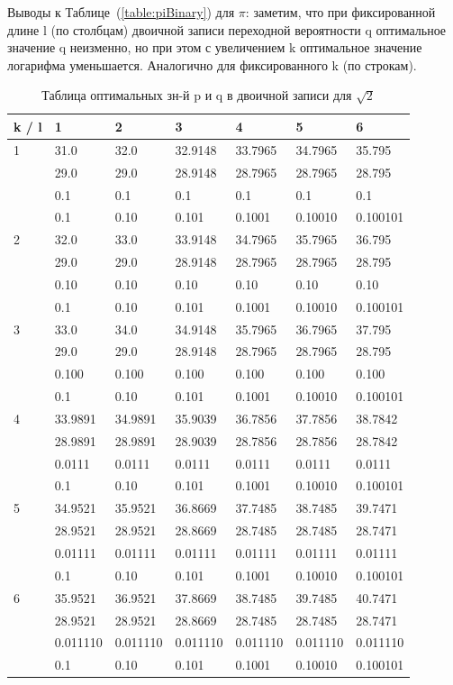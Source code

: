 \documentclass[12pt]{article}
\begin{document}
	
	Выводы к Таблице~(\ref{table:piBinary}) для $\pi$: заметим, что при фиксированной длине l (по столбцам) двоичной записи переходной вероятности q оптимальное значение q неизменно, но при этом с увеличением k оптимальное значение логарифма уменьшается. Аналогично для фиксированного k (по строкам).
	
	\begin{table}[h]
		\caption{Таблица оптимальных зн-й p и q в двоичной записи для $\sqrt{2}$}
		\label{table:2Binary}
		\begin{center}
			\begin{tabular}{|l|l|l|l|l|l|l|}
				\hline
				k / l &1 & 2 & 3 & 4 & 5 & 6\\
				\hline
				1 & 31.0& 32.0& 32.9148& 33.7965& 34.7965& 35.795\\
				& 29.0& 29.0& 28.9148& 28.7965& 28.7965& 28.795\\
				& 0.1& 0.1& 0.1& 0.1& 0.1& 0.1\\
				& 0.1& 0.10& 0.101& 0.1001& 0.10010& 0.100101\\
				\hline
				2 & 32.0& 33.0& 33.9148& 34.7965& 35.7965& 36.795\\
				& 29.0& 29.0& 28.9148& 28.7965& 28.7965& 28.795\\
				& 0.10& 0.10& 0.10& 0.10& 0.10& 0.10\\
				& 0.1& 0.10& 0.101& 0.1001& 0.10010& 0.100101\\
				\hline
				3 & 33.0& 34.0& 34.9148& 35.7965& 36.7965& 37.795\\
				& 29.0& 29.0& 28.9148& 28.7965& 28.7965& 28.795\\
				& 0.100& 0.100& 0.100& 0.100& 0.100& 0.100\\
				& 0.1& 0.10& 0.101& 0.1001& 0.10010& 0.100101\\
				\hline
				4 & 33.9891& 34.9891& 35.9039& 36.7856& 37.7856& 38.7842\\
				& 28.9891& 28.9891& 28.9039& 28.7856& 28.7856& 28.7842\\
				& 0.0111& 0.0111& 0.0111& 0.0111& 0.0111& 0.0111\\
				& 0.1& 0.10& 0.101& 0.1001& 0.10010& 0.100101\\
				\hline
				5 & 34.9521& 35.9521& 36.8669& 37.7485& 38.7485& 39.7471\\
				& 28.9521& 28.9521& 28.8669& 28.7485& 28.7485& 28.7471\\
				& 0.01111& 0.01111& 0.01111& 0.01111& 0.01111& 0.01111\\
				& 0.1& 0.10& 0.101& 0.1001& 0.10010& 0.100101\\
				\hline
				6 & 35.9521& 36.9521& 37.8669& 38.7485& 39.7485& 40.7471\\
				& 28.9521& 28.9521& 28.8669& 28.7485& 28.7485& 28.7471\\
				& 0.011110& 0.011110& 0.011110& 0.011110& 0.011110& 0.011110\\
				& 0.1& 0.10& 0.101& 0.1001& 0.10010& 0.100101\\
				\hline
			\end{tabular}
		\end{center}
	\end{table}
	
\end{document}
